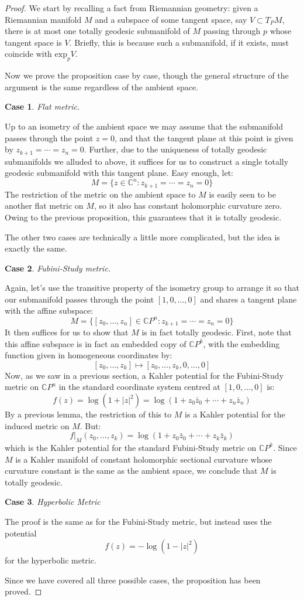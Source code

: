 \documentclass[11pt]{amsart}
\newtheorem{case}{Case}
\def \CP{ \mathbb{C}P }
\def \C{ \mathbb{C} }
\theoremstyle{definition}
\begin{document}
\begin{proof} We start by recalling a fact from Riemannian geometry: given a Riemannian manifold $M$ and a subspace of some tangent space, say $V \subset T_P M$, there is at most one totally geodesic submanifold of $M$ passing through $p$ whose tangent space is $V$.  Briefly, this is because such a submanifold, if it exists, must coincide with $ \text{exp}_p V $.  

Now we prove the proposition case by case, though the general structure of the argument is the same regardless of the ambient space.

\begin{case} Flat metric.
\end{case}
%
Up to an isometry of the ambient space we may assume that the submanifold passes through the point $z=0$, and that the tangent plane at this point is given by $z_{k+1} = \cdots = z_n = 0$.  Further, due to the uniqueness of totally geodesic submanifolds we alluded to above, it suffices for us to construct a single totally geodesic submanifold with this tangent plane.  Easy enough, let:
%
$$M = \{ z \in \C^n : z_{k+1} = \cdots = z_n = 0 \}$$
%
The restriction of the metric on the ambient space to $M$ is easily seen to be another flat metric on $M$, so it also has constant holomorphic curvature zero.  Owing to the previous proposition, this guarantees that it is totally geodesic.

The other two cases are technically a little more complicated, but the idea is exactly the same.

\begin{case} Fubini-Study metric.
\end{case}
%
Again, let's use the transitive property of the isometry group to arrange it so that our submanifold passes through the point $[1,0,\ldots,0]$ and shares a tangent plane with the affine subspace:
%
$$ M = \{ [z_0, \ldots, z_n] \in \CP^n : z_{k+1} = \cdots = z_n = 0 \} $$
%
It then suffices for us to show that $M$ is in fact totally geodesic.  First, note that this affine subspace is in fact an embedded copy of $\CP^k$, with the embedding function given in homogeneous coordinates by:
%
$$ [z_0, \ldots, z_k ] \mapsto [ z_0, \ldots, z_k, 0, \ldots, 0] $$
%
Now, as we saw in a previous section, a Kahler potential for the Fubini-Study metric on $\CP^n$ in the standard coordinate system centred at  $[1,0,\ldots,0]$ is:
%
$$ f(z) = \log( 1 + |z|^2 ) = \log( 1 + z_0 \bar{z}_0 + \cdots + z_n \bar{z}_n ) $$
%
By a previous lemma, the restriction of this to  $M$ is a Kahler potential for the induced metric on $M$.  But:
%
$$ f|_{M} (z_0, \ldots, z_k ) = \log ( 1 + z_0 \bar{z}_0 + \cdots + z_k \bar{z}_k ) $$
%
which is the Kahler potential for the standard Fubini-Study metric on $\CP^k$.  Since $M$ is a Kahler manifold of constant holomorphic sectional curvature whose curvature constant is the same as the ambient space, we conclude that $M$ is totally geodesic.

\begin{case} Hyperbolic Metric
\end{case}

The proof is the same as for the Fubini-Study metric, but instead uses the potential
%
$$ f(z) = - \log( 1 - |z|^2 ) $$
%
for the hyperbolic metric.

Since we have covered all three possible cases, the proposition has been proved.
\end{proof}
\end{document}
